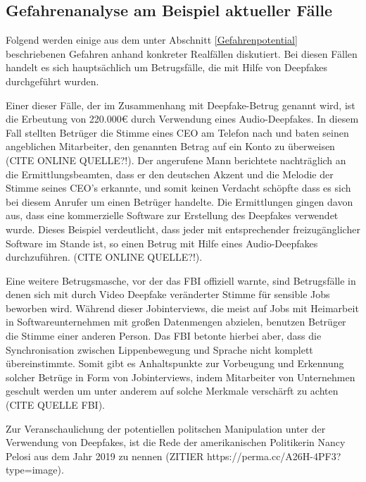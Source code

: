 \subsection{Gefahrenanalyse am Beispiel aktueller Fälle}\label{GefahrenAktuelleFaelle}
Folgend werden einige aus dem unter Abschnitt \ref{Gefahrenpotential} beschriebenen Gefahren anhand konkreter Realfällen diskutiert.
Bei diesen Fällen handelt es sich hauptsächlich um Betrugsfälle, die mit Hilfe von Deepfakes durchgeführt wurden.
\par
Einer dieser Fälle, der im Zusammenhang mit Deepfake-Betrug genannt wird, ist die Erbeutung von 220.000\euro{} durch Verwendung eines Audio-Deepfakes.
In diesem Fall stellten Betrüger die Stimme eines CEO am Telefon nach und baten seinen angeblichen Mitarbeiter, den genannten Betrag auf ein Konto zu überweisen (CITE ONLINE QUELLE?!).
Der angerufene Mann berichtete nachträglich an die Ermittlungsbeamten, dass er den deutschen Akzent und die Melodie der Stimme seines CEO's erkannte, und somit keinen Verdacht schöpfte dass es sich bei diesem Anrufer um einen Betrüger handelte.
Die Ermittlungen gingen davon aus, dass eine kommerzielle Software zur Erstellung des Deepfakes verwendet wurde.
Dieses Beispiel verdeutlicht, dass jeder mit entsprechender freizugänglicher Software im Stande ist, so einen Betrug mit Hilfe eines Audio-Deepfakes durchzuführen. (CITE ONLINE QUELLE?!).
\par
Eine weitere Betrugsmasche, vor der das FBI offiziell warnte, sind Betrugsfälle in denen sich mit durch Video Deepfake veränderter Stimme für sensible Jobs beworben wird.
Während dieser Jobinterviews, die meist auf Jobs mit Heimarbeit in Softwareunternehmen mit großen Datenmengen abzielen, benutzen Betrüger die Stimme einer anderen Person.
Das FBI betonte hierbei aber, dass die Synchronisation zwischen Lippenbewegung und Sprache nicht komplett übereinstimmte.
Somit gibt es Anhaltspunkte zur Vorbeugung und Erkennung solcher Betrüge in Form von Jobinterviews, indem Mitarbeiter von Unternehmen geschult werden um unter anderem auf solche Merkmale verschärft zu achten (CITE QUELLE FBI).
\par
Zur Veranschaulichung der potentiellen politschen Manipulation unter der Verwendung von Deepfakes, ist die Rede der amerikanischen Politikerin Nancy Pelosi aus dem Jahr 2019 zu nennen (ZITIER https://perma.cc/A26H-4PF3?type=image).
